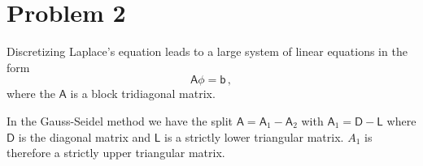 \documentclass[11pt]{article}
\newcommand{\ii}{\mathrm{i}}
\newcommand{\com}{\, ,}
\def\beq{\begin{equation}}
\def\eeq{\end{equation}}
\begin{document}
\begin{enumerate}[label=(\alph*)]

\end{enumerate}        

\section*{Problem 2}


    Discretizing Laplace's equation leads to a large system of linear equations in the form
    \beq
        \label{lap_eqn}
        \mathsf{A}\mathsf{\phi} = \mathsf{b}\com
    \eeq
    where the $\mathsf{A}$ is a block tridiagonal matrix.  

    In the Gauss-Seidel method we have the split $\mathsf{A} = \mathsf{A}_1 - \mathsf{A}_2$ with $\mathsf{A}_1 = \mathsf{D} -\mathsf{L}$ where $\mathsf{D}$ is the diagonal matrix and $\mathsf{L}$ is a strictly lower triangular matrix. $A_1$ is therefore a strictly upper triangular matrix. 
\end{document}
